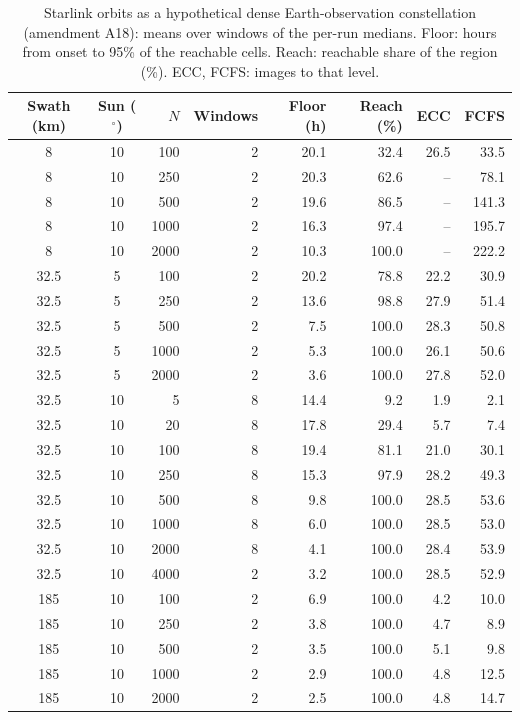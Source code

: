 \begin{table}[!t]
\centering
\footnotesize
\renewcommand{\arraystretch}{1.2}
\caption{Starlink orbits as a hypothetical dense Earth-observation constellation (amendment A18): means over windows of the per-run medians. Floor: hours from onset to 95\% of the reachable cells. Reach: reachable share of the region (\%). ECC, FCFS: images to that level.}
\label{tab:a18}
\begin{tabular}{|c|c|r|r|r|r|r|r|}
\hline
Swath (km) & Sun ($^\circ$) & $N$ & Windows & Floor (h) & Reach (\%) & ECC & FCFS \\
\hline
8 & 10 & 100 & 2 & 20.1 & 32.4 & 26.5 & 33.5 \\
\hline
8 & 10 & 250 & 2 & 20.3 & 62.6 & -- & 78.1 \\
\hline
8 & 10 & 500 & 2 & 19.6 & 86.5 & -- & 141.3 \\
\hline
8 & 10 & 1000 & 2 & 16.3 & 97.4 & -- & 195.7 \\
\hline
8 & 10 & 2000 & 2 & 10.3 & 100.0 & -- & 222.2 \\
\hline
32.5 & 5 & 100 & 2 & 20.2 & 78.8 & 22.2 & 30.9 \\
\hline
32.5 & 5 & 250 & 2 & 13.6 & 98.8 & 27.9 & 51.4 \\
\hline
32.5 & 5 & 500 & 2 & 7.5 & 100.0 & 28.3 & 50.8 \\
\hline
32.5 & 5 & 1000 & 2 & 5.3 & 100.0 & 26.1 & 50.6 \\
\hline
32.5 & 5 & 2000 & 2 & 3.6 & 100.0 & 27.8 & 52.0 \\
\hline
32.5 & 10 & 5 & 8 & 14.4 & 9.2 & 1.9 & 2.1 \\
\hline
32.5 & 10 & 20 & 8 & 17.8 & 29.4 & 5.7 & 7.4 \\
\hline
32.5 & 10 & 100 & 8 & 19.4 & 81.1 & 21.0 & 30.1 \\
\hline
32.5 & 10 & 250 & 8 & 15.3 & 97.9 & 28.2 & 49.3 \\
\hline
32.5 & 10 & 500 & 8 & 9.8 & 100.0 & 28.5 & 53.6 \\
\hline
32.5 & 10 & 1000 & 8 & 6.0 & 100.0 & 28.5 & 53.0 \\
\hline
32.5 & 10 & 2000 & 8 & 4.1 & 100.0 & 28.4 & 53.9 \\
\hline
32.5 & 10 & 4000 & 2 & 3.2 & 100.0 & 28.5 & 52.9 \\
\hline
185 & 10 & 100 & 2 & 6.9 & 100.0 & 4.2 & 10.0 \\
\hline
185 & 10 & 250 & 2 & 3.8 & 100.0 & 4.7 & 8.9 \\
\hline
185 & 10 & 500 & 2 & 3.5 & 100.0 & 5.1 & 9.8 \\
\hline
185 & 10 & 1000 & 2 & 2.9 & 100.0 & 4.8 & 12.5 \\
\hline
185 & 10 & 2000 & 2 & 2.5 & 100.0 & 4.8 & 14.7 \\
\hline
\end{tabular}
\end{table}
